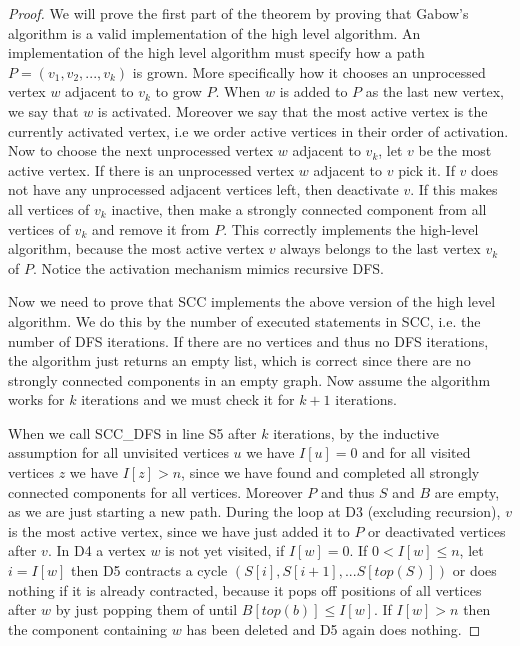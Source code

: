 \documentclass{report}
\theoremstyle{plain}
\theoremstyle{definition}
\theoremstyle{remark}
\numberwithin{definition}{chapter}
\numberwithin{example}{chapter}
\numberwithin{figure}{chapter}
\begin{document}
\begin{proof}
We will prove the first part of the theorem by proving that Gabow's algorithm is a valid implementation of the high level algorithm.
An implementation of the high level algorithm must specify how a path $P=(v_1,v_2,...,v_k)$ is grown. More specifically how it chooses an unprocessed vertex $w$ adjacent to $v_k$ to grow $P$. When $w$ is added to $P$ as the last new vertex, we say that $w$ is activated. Moreover we say that the most active vertex is the currently activated vertex, i.e we order active vertices in their order of activation. Now to choose the next unprocessed vertex $w$ adjacent to $v_k$, let $v$ be the most active vertex. If there is an unprocessed vertex $w$ adjacent to $v$ pick it. If $v$ does not have any unprocessed adjacent vertices left, then deactivate $v$. If this makes all vertices of $v_k$ inactive, then make a strongly connected component from all vertices of $v_k$ and remove it from $P$. This correctly implements the high-level algorithm, because the most active vertex $v$ always belongs to the last vertex $v_k$ of $P$. Notice the activation mechanism mimics recursive DFS.

Now we need to prove that SCC implements the above version of the high level algorithm. We do this by the number of executed statements in SCC, i.e. the number of DFS iterations. If there are no vertices and thus no DFS iterations, the algorithm just returns an empty list, which is correct since there are no strongly connected components in an empty graph. Now assume the algorithm works for $k$ iterations and we must check it for $k+1$ iterations.

When we call SCC\_DFS in line S5 after $k$ iterations, by the inductive assumption for all unvisited vertices $u$ we have $I[u]=0$ and for all visited vertices $z$ we have $I[z] > n$, since we have found and completed all strongly connected components for all vertices. Moreover $P$ and thus $S$ and $B$ are empty, as we are just starting a new path. During the loop at D3 (excluding recursion), $v$ is the most active vertex, since we have just added it to $P$ or deactivated vertices after $v$. In D4 a vertex $w$ is not yet visited, if $I[w]=0$. If $0 < I[w] \leq n$, let $i=I[w]$  then D5 contracts a cycle $(S[i],S[i+1],...S[top(S)])$ or does nothing if it is already contracted, because it pops off positions of all vertices after $w$ by just popping them of until $B[top(b)] \leq I[w]$. If $I[w] > n$ then the component containing $w$ has been deleted and D5 again does nothing.


\end{proof}
\end{document}

